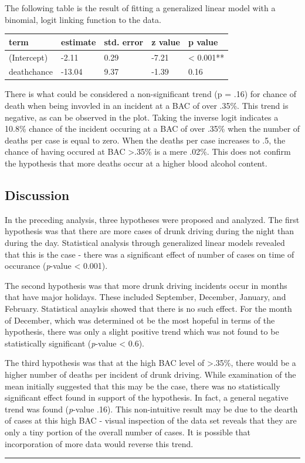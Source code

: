 \documentclass[floatsintext,man]{apa6}
\theoremstyle{definition}
\theoremstyle{definition}
\theoremstyle{definition}
\theoremstyle{remark}
\begin{document}
The following table is the result of fitting a generalized linear model
with a binomial, logit linking function to the data.

\begin{longtable}[]{@{}lllll@{}}
\toprule
term & estimate & std. error & z value & p value\tabularnewline
\midrule
\endhead
(Intercept) & -2.11 & 0.29 & -7.21 & \textless{} 0.001**\tabularnewline
deathchance & -13.04 & 9.37 & -1.39 & 0.16\tabularnewline
\bottomrule
\end{longtable}

There is what could be considered a non-significant trend (p = .16) for
chance of death when being invovled in an incident at a BAC of over
.35\%. This trend is negative, as can be observed in the plot. Taking
the inverse logit indicates a 10.8\% chance of the incident occuring at
a BAC of over .35\% when the number of deaths per case is equal to zero.
When the deaths per case increases to .5, the chance of having occured
at BAC \textgreater{}.35\% is a mere .02\%. This does not confirm the
hypothesis that more deaths occur at a higher blood alcohol content.

\subsection{Discussion}\label{discussion}

In the preceding analysis, three hypotheses were proposed and analyzed.
The first hypothesis was that there are more cases of drunk driving
during the night than during the day. Statistical analysis through
generalized linear models revealed that this is the case - there was a
significant effect of number of cases on time of occurance
(\emph{p}-value \textless{} 0.001).

The second hypothesis was that more drunk driving incidents occur in
months that have major holidays. These included September, December,
January, and February. Statistical anaylsis showed that there is no such
effect. For the month of December, which was determined ot be the most
hopeful in terms of the hypothesis, there was only a slight positive
trend which was not found to be statistically significant
(\emph{p}-value \textless{} 0.6).

The third hypothesis was that at the high BAC level of
\textgreater{}.35\%, there would be a higher number of deaths per
incident of drunk driving. While examination of the mean initially
suggested that this may be the case, there was no statistically
significant effect found in support of the hypothesis. In fact, a
general negative trend was found (\emph{p}-value .16). This
non-intuitive result may be due to the dearth of cases at this high BAC
- visual inspection of the data set reveals that they are only a tiny
portion of the overall number of cases. It is possible that
incorporation of more data would reverse this trend.

\begin{center}\rule{0.5\linewidth}{\linethickness}\end{center}

\setlength{\parindent}{-0.5in} \setlength{\leftskip}{0.5in}
\end{document}
